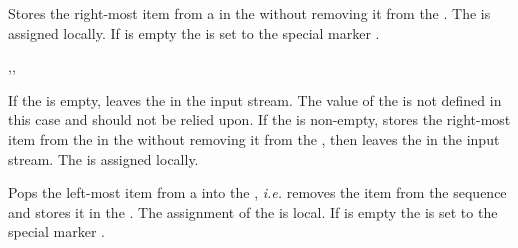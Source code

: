 \documentclass[oneside]{book}
\begin{document}
\begin{function}{\seqGetRight}
\begin{syntax}
  
\end{syntax}
Stores the right-most item from a  in the
 without removing it from the
. The  is assigned locally.
If  is empty the 
is set to the special marker .
\begin{demohigh}
\seqSetFromClist {}
\seqGetRight \lTmpaSeq \lTmpaTl
\tlUse \lTmpaTl
\end{demohigh}
\end{function}

\begin{function}{\seqGetRightT,\seqGetRightF,\seqGetRightTF}
\begin{syntax}
   
   
    
\end{syntax}
If the  is empty, leaves the  in the
input stream.  The value of the  is
not defined in this case and should not be relied upon.  If the
 is non-empty, stores the right-most item from the
in the  without removing it from the
, then leaves the  in the input stream.
The  is assigned locally.
\begin{demohigh}
\seqSetFromClist {}
\seqGetRightTF \lTmpaSeq {} {}
\end{demohigh}
\end{function}

\begin{function}{\seqPopLeft}
\begin{syntax}
  
\end{syntax}
Pops the left-most item from a  into the
, \emph{i.e.} removes the item from the
sequence and stores it in the .
The assignment of the  is local.
If  is empty the 
is set to the special marker .
\begin{demohigh}
\seqSetFromClist {}
\seqPopLeft \lTmpaSeq \lTmpaTl
\seqVarJoin \lTmpaSeq {,}
\end{demohigh}
\end{function}
\end{document}
